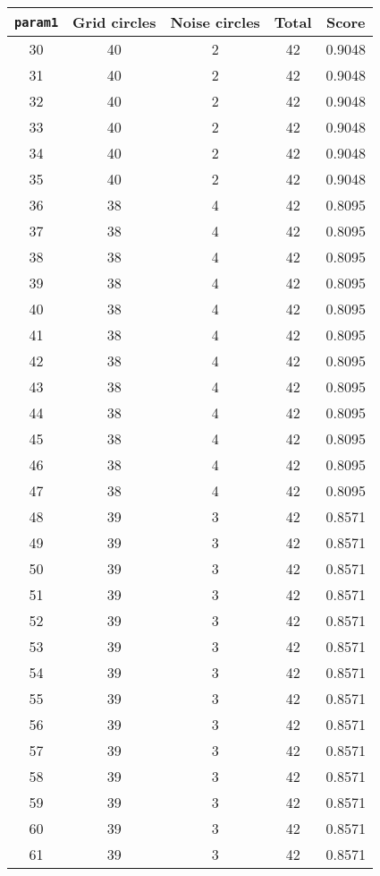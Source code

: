 \documentclass[letterpaper, 12pt]{article}
\begin{document}
\begin{longtable}{|c|c|c|c|c|}
\hline
\textbf{\texttt{param1}} & \textbf{Grid circles} & \textbf{Noise circles} & \textbf{Total} & \textbf{Score} \\
\hline
30 & 40 & 2 & 42 & 0.9048 \\
\hline
31 & 40 & 2 & 42 & 0.9048 \\
\hline
32 & 40 & 2 & 42 & 0.9048 \\
\hline
33 & 40 & 2 & 42 & 0.9048 \\
\hline
34 & 40 & 2 & 42 & 0.9048 \\
\hline
35 & 40 & 2 & 42 & 0.9048 \\
\hline
36 & 38 & 4 & 42 & 0.8095 \\
\hline
37 & 38 & 4 & 42 & 0.8095 \\
\hline
38 & 38 & 4 & 42 & 0.8095 \\
\hline
39 & 38 & 4 & 42 & 0.8095 \\
\hline
40 & 38 & 4 & 42 & 0.8095 \\
\hline
41 & 38 & 4 & 42 & 0.8095 \\
\hline
42 & 38 & 4 & 42 & 0.8095 \\
\hline
43 & 38 & 4 & 42 & 0.8095 \\
\hline
44 & 38 & 4 & 42 & 0.8095 \\
\hline
45 & 38 & 4 & 42 & 0.8095 \\
\hline
46 & 38 & 4 & 42 & 0.8095 \\
\hline
47 & 38 & 4 & 42 & 0.8095 \\
\hline
48 & 39 & 3 & 42 & 0.8571 \\
\hline
49 & 39 & 3 & 42 & 0.8571 \\
\hline
50 & 39 & 3 & 42 & 0.8571 \\
\hline
51 & 39 & 3 & 42 & 0.8571 \\
\hline
52 & 39 & 3 & 42 & 0.8571 \\
\hline
53 & 39 & 3 & 42 & 0.8571 \\
\hline
54 & 39 & 3 & 42 & 0.8571 \\
\hline
55 & 39 & 3 & 42 & 0.8571 \\
\hline
56 & 39 & 3 & 42 & 0.8571 \\
\hline
57 & 39 & 3 & 42 & 0.8571 \\
\hline
58 & 39 & 3 & 42 & 0.8571 \\
\hline
59 & 39 & 3 & 42 & 0.8571 \\
\hline
60 & 39 & 3 & 42 & 0.8571 \\
\hline
61 & 39 & 3 & 42 & 0.8571 \\

\end{longtable}
\end{document}
